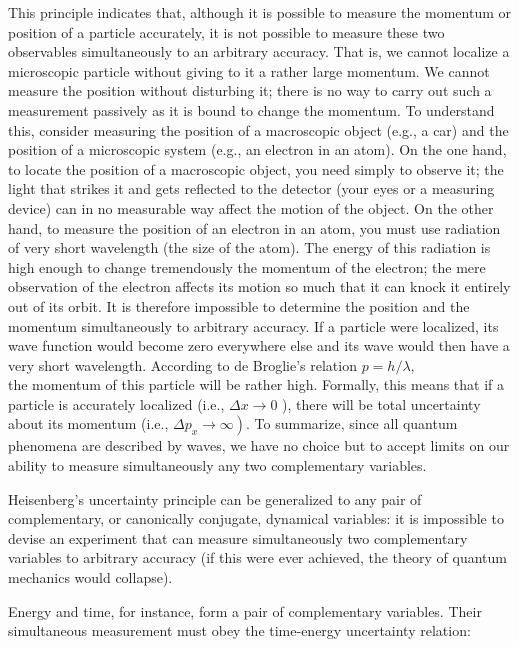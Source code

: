 \documentclass[10pt]{article}
\begin{document}
This principle indicates that, although it is possible to measure the momentum or position of a particle accurately, it is not possible to measure these two observables simultaneously to an arbitrary accuracy. That is, we cannot localize a microscopic particle without giving to it a rather large momentum. We cannot measure the position without disturbing it; there is no way to carry out such a measurement passively as it is bound to change the momentum. To understand this, consider measuring the position of a macroscopic object (e.g., a car) and the position of a microscopic system (e.g., an electron in an atom). On the one hand, to locate the position of a macroscopic object, you need simply to observe it; the light that strikes it and gets reflected to the detector (your eyes or a measuring device) can in no measurable way affect the motion of the object. On the other hand, to measure the position of an electron in an atom, you must use radiation of very short wavelength (the size of the atom). The energy of this radiation is high enough to change tremendously the momentum of the electron; the mere observation of the electron affects its motion so much that it can knock it entirely out of its orbit. It is therefore impossible to determine the position and the momentum simultaneously to arbitrary accuracy. If a particle were localized, its wave function would become zero everywhere else and its wave would then have a very short wavelength. According to de Broglie's relation $p=h / \lambda$,\\
the momentum of this particle will be rather high. Formally, this means that if a particle is accurately localized (i.e., $\Delta x \rightarrow 0$ ), there will be total uncertainty about its momentum (i.e., $\left.\Delta p_{x} \rightarrow \infty\right)$. To summarize, since all quantum phenomena are described by waves, we have no choice but to accept limits on our ability to measure simultaneously any two complementary variables.

Heisenberg's uncertainty principle can be generalized to any pair of complementary, or canonically conjugate, dynamical variables: it is impossible to devise an experiment that can measure simultaneously two complementary variables to arbitrary accuracy (if this were ever achieved, the theory of quantum mechanics would collapse).

Energy and time, for instance, form a pair of complementary variables. Their simultaneous measurement must obey the time-energy uncertainty relation:
\end{document}
